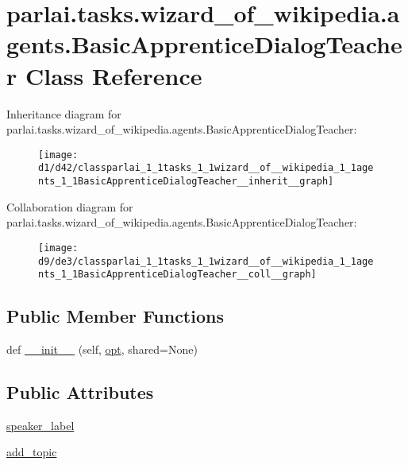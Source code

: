 \hypertarget{classparlai_1_1tasks_1_1wizard__of__wikipedia_1_1agents_1_1BasicApprenticeDialogTeacher}{}\section{parlai.\+tasks.\+wizard\+\_\+of\+\_\+wikipedia.\+agents.\+Basic\+Apprentice\+Dialog\+Teacher Class Reference}
\label{classparlai_1_1tasks_1_1wizard__of__wikipedia_1_1agents_1_1BasicApprenticeDialogTeacher}


Inheritance diagram for parlai.\+tasks.\+wizard\+\_\+of\+\_\+wikipedia.\+agents.\+Basic\+Apprentice\+Dialog\+Teacher\+:\nopagebreak
\begin{figure}[H]
\begin{center}
\leavevmode
\texttt{[image: d1/d42/classparlai\_1\_1tasks\_1\_1wizard\_\_of\_\_wikipedia\_1\_1agents\_1\_1BasicApprenticeDialogTeacher\_\_inherit\_\_graph]}
\end{center}
\end{figure}


Collaboration diagram for parlai.\+tasks.\+wizard\+\_\+of\+\_\+wikipedia.\+agents.\+Basic\+Apprentice\+Dialog\+Teacher\+:\nopagebreak
\begin{figure}[H]
\begin{center}
\leavevmode
\texttt{[image: d9/de3/classparlai\_1\_1tasks\_1\_1wizard\_\_of\_\_wikipedia\_1\_1agents\_1\_1BasicApprenticeDialogTeacher\_\_coll\_\_graph]}
\end{center}
\end{figure}
\subsection*{Public Member Functions}
\begin{DoxyCompactItemize}
\item 
def \hyperlink{classparlai_1_1tasks_1_1wizard__of__wikipedia_1_1agents_1_1BasicApprenticeDialogTeacher_ad8d773c291ac75c5ecd1ec1d3f2a0797}{\+\_\+\+\_\+init\+\_\+\+\_\+} (self, \hyperlink{classparlai_1_1tasks_1_1wizard__of__wikipedia_1_1agents_1_1WizardOfWikipediaTeacher_a5d97ef38a8c6e7df29724122f5b9ff72}{opt}, shared=None)
\end{DoxyCompactItemize}
\subsection*{Public Attributes}
\begin{DoxyCompactItemize}
\item 
\hyperlink{classparlai_1_1tasks_1_1wizard__of__wikipedia_1_1agents_1_1BasicApprenticeDialogTeacher_a68999910fbe14ab7c1e60e48b692480d}{speaker\+\_\+label}
\item 
\hyperlink{classparlai_1_1tasks_1_1wizard__of__wikipedia_1_1agents_1_1BasicApprenticeDialogTeacher_a7e627699dba099f69d5ce0b139caa02e}{add\+\_\+topic}
\end{DoxyCompactItemize}
